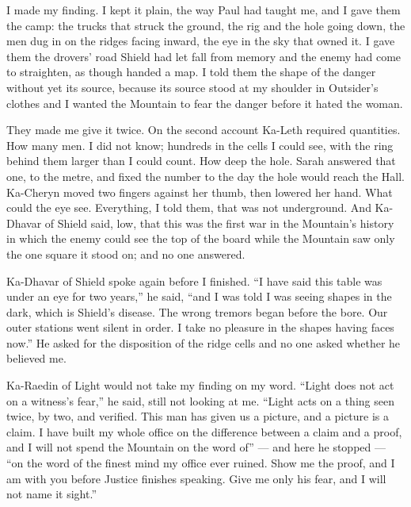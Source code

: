\ornament

I made my finding. I kept it plain, the way Paul had taught me, and I gave them the camp: the trucks that struck the ground, the rig and the hole going down, the men dug in on the ridges facing inward, the eye in the sky that owned it. I gave them the drovers' road Shield had let fall from memory and the enemy had come to straighten, as though handed a map. I told them the shape of the danger without yet its source, because its source stood at my shoulder in Outsider's clothes and I wanted the Mountain to fear the danger before it hated the woman.\par

They made me give it twice. On the second account Ka-Leth required quantities. How many men. I did not know; hundreds in the cells I could see, with the ring behind them larger than I could count. How deep the hole. Sarah answered that one, to the metre, and fixed the number to the day the hole would reach the Hall. Ka-Cheryn moved two fingers against her thumb, then lowered her hand. What could the eye see. Everything, I told them, that was not underground. And Ka-Dhavar of Shield said, low, that this was the first war in the Mountain's history in which the enemy could see the top of the board while the Mountain saw only the one square it stood on; and no one answered.\par

Ka-Dhavar of Shield spoke again before I finished. ``I have said this table was under an eye for two years,'' he said, ``and I was told I was seeing shapes in the dark, which is Shield's disease. The wrong tremors began before the bore. Our outer stations went silent in order. I take no pleasure in the shapes having faces now.'' He asked for the disposition of the ridge cells and no one asked whether he believed me.\par

Ka-Raedin of Light would not take my finding on my word. ``Light does not act on a witness's fear,'' he said, still not looking at me. ``Light acts on a thing seen twice, by two, and verified. This man has given us a picture, and a picture is a claim. I have built my whole office on the difference between a claim and a proof, and I will not spend the Mountain on the word of'' --- and here he stopped --- ``on the word of the finest mind my office ever ruined. Show me the proof, and I am with you before Justice finishes speaking. Give me only his fear, and I will not name it sight.''\par

